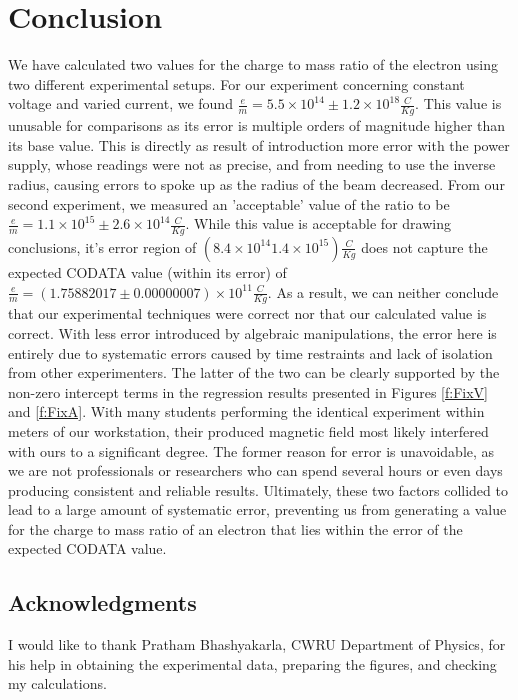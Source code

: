 \documentclass[12pt]{article}
\newcommand{\paren}[1]{\left( {#1} \right)}
\begin{document}
\section{Conclusion}
We have calculated two values for the charge to mass ratio of the electron using two different experimental setups. For our experiment concerning constant voltage and varied current, we found $\frac{e}{m}=5.5\times10^{14}\pm1.2\times10^{18} \frac{C}{Kg}$. This value is unusable for comparisons as its error is multiple orders of magnitude higher than its base value. This is directly as result of introduction more error with the power supply, whose readings were not as precise, and from needing to use the inverse radius, causing errors to spoke up as the radius of the beam decreased. From our second experiment, we measured an 'acceptable' value of the ratio to be $\frac{e}{m}=1.1\times10^{15}\pm2.6\times10^{14} \frac{C}{Kg}$. While this value is acceptable for drawing conclusions, it's error region of $\paren{8.4\times10^{14}1.4\times10^{15}}\frac{C}{Kg}$ does not capture the expected CODATA value (within its error) of $\frac{e}{m}=(1.75882017\pm0.00000007)\times10^{11} \frac{C}{Kg}$. As a result, we can neither conclude that our experimental techniques were correct nor that our calculated value is correct. With less error introduced by algebraic manipulations, the error here is entirely due to systematic errors caused by time restraints and lack of isolation from other experimenters. The latter of the two can be clearly supported by the non-zero intercept terms in the regression results presented in Figures \ref{f:FixV} and \ref{f:FixA}. With many students performing the identical experiment within meters of our workstation, their produced magnetic field most likely interfered with ours to a significant degree. The former reason for error is unavoidable, as we are not professionals or researchers who can spend several hours or even days producing consistent and reliable results. Ultimately, these two factors collided to lead to a large amount of systematic error, preventing us from generating a value for the charge to mass ratio of an electron that lies within the error of the expected CODATA value.

\subsection{Acknowledgments}
I would like to thank Pratham Bhashyakarla, CWRU Department of Physics, for his help in obtaining the experimental data, preparing the figures, and checking my calculations.
\end{document}
